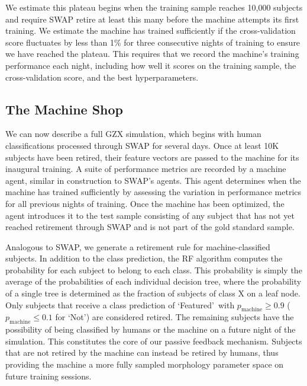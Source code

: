 \documentclass[twocolumn,  trackchanges, ]{aastex6}%
\newcommand{\feat}{`Featured'}
\newcommand{\notfeat}{`Not'}
\begin{document}
We estimate this plateau begins when the training 
sample reaches 10,000 subjects and require SWAP retire at least this many 
 before the machine attempts its first training.  We estimate the machine 
has trained sufficiently if the cross-validation score fluctuates by less than 1\% 
for three consecutive nights of training to ensure we have reached the plateau.  
This requires that we record the machine's training performance each night, 
including how well it scores on the training sample, the 
cross-validation score, and the best hyperparameters. 



\subsection{The Machine Shop}\label{sec: machine shop}
We can now describe a full GZX simulation, which begins with human classifications 
processed through SWAP for several days.   
Once at least 10K subjects have been retired, their feature vectors are passed to 
the machine for its inaugural training. 
A suite of performance metrics are recorded by a machine agent, similar
in construction to SWAP's agents. This agent determines 
when the machine has trained sufficiently by assessing the variation
in performance metrics for all previous nights of training. 
Once the machine has been optimized, the agent introduces it to the test sample
consisting of any subject that has not yet reached retirement through SWAP 
and is not part of the gold standard sample.  

Analogous to SWAP, we generate a retirement rule for machine-classified subjects. In addition to the class prediction, the RF algorithm computes the probability for each subject to belong to each class.  This probability is simply the average of the probabilities of each individual decision tree, where the probability of a single tree is determined as the fraction of subjects of class X on a leaf node.  Only subjects that receive a class prediction of \feat~with $p_{\mathrm{machine}} \ge 0.9$ ($p_{\mathrm{machine}} \le 0.1$ for \notfeat) are considered retired. The remaining subjects have the possibility of being classified by humans or the machine on a future night of the simulation. This constitutes the core of our passive feedback mechanism. Subjects that are not retired by the machine can instead be retired by humans, thus providing the machine a more fully sampled morphology parameter space on future training sessions. 
\end{document}
